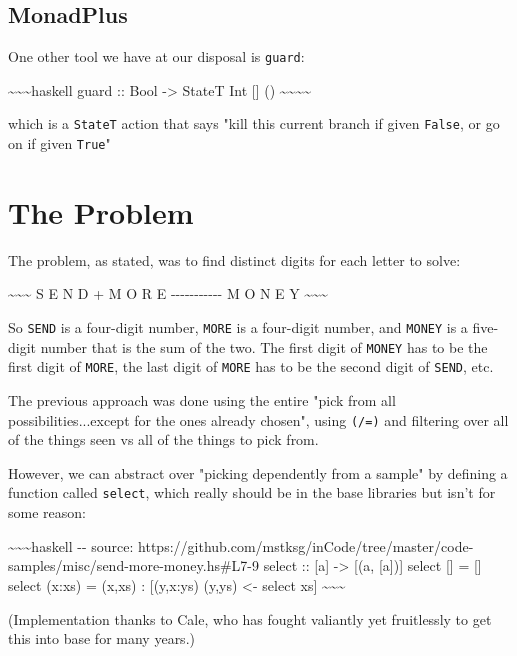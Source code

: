 \documentclass[]{article}
\begin{document}
\subsection{MonadPlus}

One other tool we have at our disposal is \texttt{guard}:

\textasciitilde{}\textasciitilde{}\textasciitilde{}haskell guard :: Bool
-\textgreater{} StateT Int {[}{]} ()
\textasciitilde{}\textasciitilde{}\textasciitilde{}\textasciitilde{}

which is a \texttt{StateT} action that says "kill this current branch if given
\texttt{False}, or go on if given \texttt{True}"

\section{The Problem}

The problem, as stated, was to find distinct digits for each letter to solve:

\textasciitilde{}\textasciitilde{}\textasciitilde{} S E N D + M O R E
-\/-\/-\/-\/-\/-\/-\/-\/-\/-\/- M O N E Y
\textasciitilde{}\textasciitilde{}\textasciitilde{}

So \texttt{SEND} is a four-digit number, \texttt{MORE} is a four-digit number,
and \texttt{MONEY} is a five-digit number that is the sum of the two. The first
digit of \texttt{MONEY} has to be the first digit of \texttt{MORE}, the last
digit of \texttt{MORE} has to be the second digit of \texttt{SEND}, etc.

The previous approach was done using the entire "pick from all
possibilities...except for the ones already chosen", using \texttt{(/=)} and
filtering over all of the things seen vs all of the things to pick from.

However, we can abstract over "picking dependently from a sample" by defining a
function called \texttt{select}, which really should be in the base libraries
but isn't for some reason:

\textasciitilde{}\textasciitilde{}\textasciitilde{}haskell -\/- source:
https://github.com/mstksg/inCode/tree/master/code-samples/misc/send-more-money.hs\#L7-9
select :: {[}a{]} -\textgreater{} {[}(a, {[}a{]}){]} select {[}{]} = {[}{]}
select (x:xs) = (x,xs) : {[}(y,x:ys) \textbar{} (y,ys) \textless{}- select xs{]}
\textasciitilde{}\textasciitilde{}\textasciitilde{}

(Implementation thanks to Cale, who has fought valiantly yet fruitlessly to get
this into base for many years.)
\end{document}
